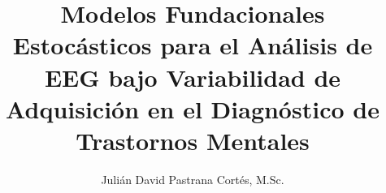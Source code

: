 \usepackage[es-tabla]{babel}

\usepackage{mathptmx} %

\usepackage{setspace}
\singlespacing

\usepackage[margin=1in]{geometry}


\usepackage{hyperref}
\usepackage{parskip}
\usepackage[capitalise, noabbrev]{cleveref}



\title{
	\textbf{
		Modelos Fundacionales Estocásticos para el Análisis de EEG bajo Variabilidad de Adquisición en el Diagnóstico de Trastornos Mentales
	}
	}
\author{
	Julián David Pastrana Cortés, M.Sc.
	}


\date{}
